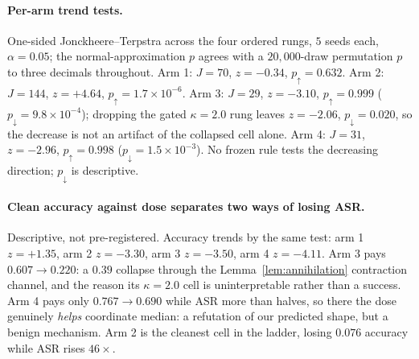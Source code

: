 \documentclass{article}
\begin{document}
\paragraph{Per-arm trend tests.} One-sided Jonckheere--Terpstra across the four ordered rungs, $5$ seeds each, $\alpha = 0.05$; the normal-approximation $p$ agrees with a $20{,}000$-draw permutation $p$ to three decimals throughout. Arm 1: $J = 70$, $z = -0.34$, $p_{\uparrow} = 0.632$. Arm 2: $J = 144$, $z = +4.64$, $p_{\uparrow} = 1.7{\times}10^{-6}$. Arm 3: $J = 29$, $z = -3.10$, $p_{\uparrow} = 0.999$ ($p_{\downarrow} = 9.8{\times}10^{-4}$); dropping the gated $\kappa{=}2.0$ rung leaves $z = -2.06$, $p_{\downarrow} = 0.020$, so the decrease is not an artifact of the collapsed cell alone. Arm 4: $J = 31$, $z = -2.96$, $p_{\uparrow} = 0.998$ ($p_{\downarrow} = 1.5{\times}10^{-3}$). No frozen rule tests the decreasing direction; $p_{\downarrow}$ is descriptive.

\paragraph{Clean accuracy against dose separates two ways of losing ASR.} Descriptive, not pre-registered. Accuracy trends by the same test: arm 1 $z = +1.35$, arm 2 $z = -3.30$, arm 3 $z = -3.50$, arm 4 $z = -4.11$. Arm 3 pays $0.607 \to 0.220$: a $0.39$ collapse through the Lemma~\ref{lem:annihilation} contraction channel, and the reason its $\kappa{=}2.0$ cell is uninterpretable rather than a success. Arm 4 pays only $0.767 \to 0.690$ while ASR more than halves, so there the dose genuinely \emph{helps} coordinate median: a refutation of our predicted shape, but a benign mechanism. Arm 2 is the cleanest cell in the ladder, losing $0.076$ accuracy while ASR rises $46\times$.
\end{document}

